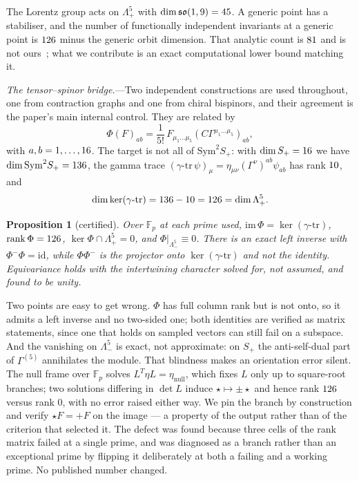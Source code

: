 \documentclass[
  aps,prd,
  reprint,
  letterpaper,
  amsmath,amssymb,
  nofootinbib,
  superscriptaddress
]{revtex4-2}
\theoremstyle{plain}
\newtheorem{proposition}[theorem]{Proposition}
\newcommand{\Fp}{\mathbb{F}_p}
\begin{document}
The Lorentz group acts on $\Lambda^5_+$ with
$\dim\mathfrak{so}(1,9)=45$. A generic point has a stabiliser,
and the number of functionally independent invariants at a generic point is
$126$ minus the generic orbit dimension. That analytic count is
$81$ and is not ours~\cite{Hutomo:2025chiral}; what we
contribute is an exact computational lower bound matching it.

\emph{The tensor--spinor bridge.}---Two independent constructions are used
throughout, one from contraction graphs and one from chiral bispinors, and their
agreement is the paper's main internal control. They are related by
\begin{equation}
\Phi(F)_{ab}=\frac{1}{5!}\,F_{\mu_1\dots\mu_5}(C\Gamma^{\mu_1\dots\mu_5})_{ab},
\label{eq:bridge}
\end{equation}
with $a,b=1,\dots,16$. The target is not all of $\mathrm{Sym}^2S_+$:
with $\dim S_+=16$ we have $\dim\mathrm{Sym}^2S_+=136$, the
gamma trace $(\gamma\text{-}\mathrm{tr}\,\psi)_\mu=\eta_{\mu\nu}(\Gamma^\nu)^{ab}\psi_{ab}$
has rank $10$, and
\begin{equation}
\dim\ker(\gamma\text{-}\mathrm{tr})=136-10
=126=\dim\Lambda^5_+ .
\label{eq:dimcount}
\end{equation}

\begin{proposition}[certified]
\label{prop:bridge}
Over $\Fp$ at each prime used, $\mathrm{im}\,\Phi=\ker(\gamma\text{-}\mathrm{tr})$,
$\mathrm{rank}\,\Phi=126$, $\ker\Phi\cap\Lambda^5_+=0$, and
$\Phi|_{\Lambda^5_-}\equiv0$. There is an exact left inverse with
$\Phi^-\Phi=\mathrm{id}$, while $\Phi\Phi^-$ is the projector onto
$\ker(\gamma\text{-}\mathrm{tr})$ and not the identity. Equivariance holds with
the intertwining character solved for, not assumed, and found to be unity.
\end{proposition}

Two points are easy to get wrong. $\Phi$ has full column rank but is not onto,
so it admits a left inverse and no two-sided one; both identities are verified
as matrix statements, since one that holds on sampled vectors can still fail on
a subspace. And the vanishing on $\Lambda^5_-$ is exact, not approximate: on
$S_+$ the anti-self-dual part of $\Gamma^{(5)}$ annihilates the module. That
blindness makes an orientation error silent. The null frame over $\Fp$ solves
$L^{T}\eta L=\eta_{\mathrm{null}}$, which fixes $L$ only up to square-root
branches; two solutions differing in $\det L$ induce $\star\mapsto\pm\star$ and
hence rank $126$ versus rank $0$, with no error raised either
way. We pin the branch by construction and verify $\star F=+F$ on the image --- a
property of the output rather than of the criterion that selected it. The defect
was found because three cells of the rank matrix failed at a single prime, and
was diagnosed as a branch rather than an exceptional prime by flipping it
deliberately at both a failing and a working prime. No published number changed.
\end{document}
